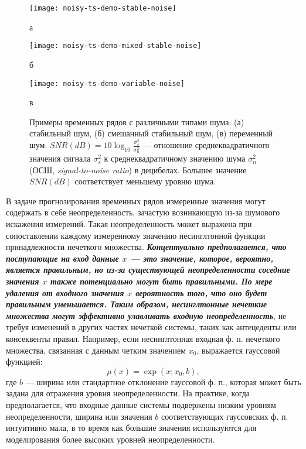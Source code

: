 \begin{figure}[tb!]
	\centering
	\begin{minipage}[b]{0.48\textwidth}
		\centering
		\texttt{[image: noisy-ts-demo-stable-noise]}
		\caption*{а}
	\end{minipage}
	\hfill
	\begin{minipage}[b]{0.48\textwidth}
		\centering
		\texttt{[image: noisy-ts-demo-mixed-stable-noise]}
		\caption*{б}
	\end{minipage}
	\vspace{0.5em}
	
	\begin{minipage}[b]{0.48\textwidth}
		\centering
		\texttt{[image: noisy-ts-demo-variable-noise]}
		\caption*{в}
	\end{minipage}
	\caption{Примеры временных рядов с различными типами шума: (а) стабильный шум, (б) смешанный стабильный шум, (в) переменный шум. $SNR(dB) = 10 \log_{10} \frac{\sigma^2_s}{\sigma^2_n}$ --- отношение среднеквадратичного значения сигнала $\sigma^2_s$ к среднеквадратичному значению шума $\sigma^2_n$ (ОСШ, \textit{signal-to-noise ratio}) в децибелах. Большее значение $SNR(dB)$ соответствует меньшему уровню шума.}
	\label{fig:noisy-ts-demo}
\end{figure}

В задаче прогнозирования временных рядов измеренные значения могут содержать в себе неопределенность, зачастую возникающую из-за шумового искажения измерений. Такая неопределенность может выражена при сопоставлении каждому измеренному значению несинглтонной функции принадлежности нечеткого множества. \textbf{\textit{Концептуально предполагается, что поступающие на вход данные $x$ --- это значение, которое, вероятно, является правильным, но из-за существующей неопределенности соседние значения $x$ также потенциально могут быть правильными. По мере удаления от входного значения $x$ вероятность того, что оно будет правильным уменьшается. Таким образом, несинглтонные нечеткие множества могут эффективно улавливать входную неопределенность}}, не требуя изменений в других частях нечеткой системы, таких как антецеденты или консеквенты правил. Например, если несинглтонная входная ф. п. нечеткого множества, связанная с данным четким значением $x_0$, выражается гауссовой функцией:
\[
\mu(x) = \exp \left(x; x_0, b\right),
\]
где $b$ --- ширина или стандартное отклонение гауссовой ф. п., которая может быть задана для отражения уровня неопределенности. На практике, когда предполагается, что входные данные системы подвержены низким уровням неопределенности, ширина или значения $b$ соответствующих гауссовских ф. п. интуитивно мала, в то время как большие значения используются для моделирования более высоких уровней неопределенности.

